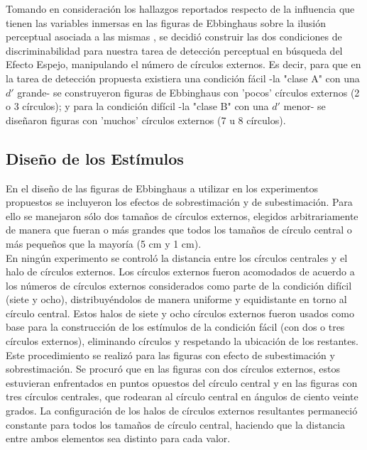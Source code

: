 Tomando en consideración los hallazgos reportados respecto de la influencia que tienen las variables inmersas en las figuras de Ebbinghaus sobre la ilusión perceptual asociada a las mismas \parencite{Massaro1971}, se decidió construir las dos condiciones de discriminabilidad para nuestra tarea de detección perceptual en búsqueda del Efecto Espejo, manipulando el número de círculos externos. Es decir, para que en la tarea de detección propuesta existiera una condición fácil -la "clase A" con una $d'$ grande- se construyeron figuras de Ebbinghaus con 'pocos' círculos externos (2 o 3 círculos); y para la condición difícil -la "clase B" con una $d'$ menor- se diseñaron figuras con 'muchos' círculos externos (7 u 8 círculos).\\ 

\subsection{Diseño de los Estímulos}

En el diseño de las figuras de Ebbinghaus a utilizar en los experimentos propuestos se incluyeron los efectos de sobrestimación y de subestimación. Para ello se manejaron sólo dos tamaños de círculos externos, elegidos arbitrariamente de manera que fueran o más grandes que todos los tamaños de círculo central o más pequeños que la mayoría (5 cm y 1 cm).\\

En ningún experimento se controló la distancia entre los círculos centrales y el halo de círculos externos. Los círculos externos fueron acomodados de acuerdo a los números de círculos externos considerados como parte de la condición difícil (siete y ocho), distribuyéndolos de manera uniforme y equidistante en torno al círculo central. Estos halos de siete y ocho círculos externos fueron usados como base para la construcción de los estímulos de la condición fácil (con dos o tres círculos externos), eliminando círculos y respetando la ubicación de los restantes. Este procedimiento se realizó para las figuras con efecto de subestimación y sobrestimación. Se procuró que en las figuras con dos círculos externos, estos estuvieran enfrentados en puntos opuestos del círculo central y en las figuras con tres círculos centrales, que rodearan al círculo central en ángulos de ciento veinte grados. La configuración de los halos de círculos externos resultantes permaneció constante para todos los tamaños de círculo central, haciendo que la distancia entre ambos elementos sea distinto para cada valor.\\

